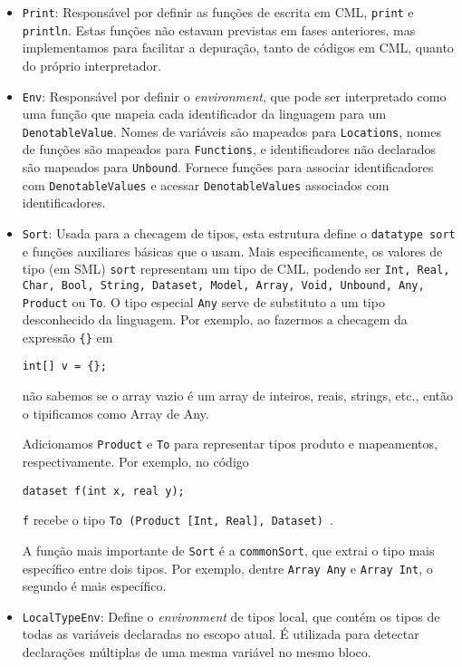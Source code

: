 \documentclass[12pt]{article}
\begin{document}
\begin{enumerate}
\begin{itemize}
\item \texttt{Print}: Responsável por definir as funções de escrita em CML, \texttt{print} e \texttt{println}. Estas funções não estavam previstas em fases anteriores, mas implementamos para facilitar a depuração, tanto de códigos em CML, quanto do próprio interpretador.
 
\item \texttt{Env}: Responsável por definir o \textit{environment}, que pode ser interpretado como uma função que mapeia cada identificador da linguagem para um \texttt{DenotableValue}. Nomes de variáveis são mapeados para \texttt{Locations}, nomes de funções são mapeados para \texttt{Functions}, e identificadores não declarados são mapeados para \texttt{Unbound}. Fornece funções para associar identificadores com \texttt{DenotableValues} e acessar \texttt{DenotableValues} associados com identificadores.

\item \texttt{Sort}: Usada para a checagem de tipos, esta estrutura define o \texttt{datatype sort} e funções auxiliares básicas que o usam. Mais especificamente, os valores de tipo (em SML) \texttt{sort} representam um tipo de CML, podendo ser \texttt{Int, Real, Char, Bool, String, Dataset, Model, Array, Void, Unbound, Any, Product} ou \texttt{To}. O tipo especial \texttt{Any} serve de substituto a um tipo desconhecido da linguagem. Por exemplo, ao fazermos a checagem da expressão \texttt{\{\}} em

\begin{Verbatim}
int[] v = {};
\end{Verbatim}

não sabemos se o array vazio é um array de inteiros, reais, strings, etc., então o tipificamos como Array de Any.

Adicionamos \texttt{Product} e \texttt{To} para representar tipos produto e mapeamentos, respectivamente. Por exemplo, no código

\begin{Verbatim}
dataset f(int x, real y);
\end{Verbatim}

\texttt{f} recebe o tipo \texttt{To (Product [Int, Real], Dataset) }.

A função mais importante de \texttt{Sort} é a \texttt{commonSort}, que extrai o tipo mais específico entre dois tipos. Por exemplo, dentre \texttt{Array Any} e \texttt{Array Int}, o segundo é mais específico.

\item \texttt{LocalTypeEnv}: Define o \textit{environment} de tipos local, que contém os tipos de todas as variáveis declaradas no escopo atual. É utilizada para detectar declarações múltiplas de uma mesma variável no mesmo bloco.


\end{itemize}
\end{enumerate}
\end{document}
